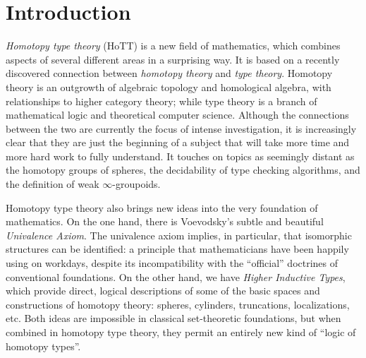 \chapter*{Introduction} \label{cha:introduction}



%
%
%
%
%
%
%
%

\emph{Homotopy type theory} (HoTT) is a new field of mathematics, which combines aspects of several different areas in a surprising way.
It is based on a recently discovered connection between \emph{homotopy theory} and \emph{type theory}.
Homotopy theory is an outgrowth of algebraic topology and homological algebra, with relationships to higher category theory; while type theory is a branch of mathematical logic and theoretical computer science.
Although the connections between the two are currently the focus of intense investigation, it is increasingly clear that they are just the beginning of a subject that will take more time and more hard work to fully understand.
It touches on topics as seemingly distant as the homotopy groups of spheres, the decidability of type checking algorithms, and the definition of weak $\infty$-groupoids.

Homotopy type theory also brings new ideas into the very foundation of mathematics.
On the one hand, there is Voevodsky's subtle and beautiful \emph{Univalence Axiom}.
The univalence axiom implies, in particular, that isomorphic structures can be identified: a principle that mathematicians have been happily using on workdays, despite its incompatibility with the ``official'' doctrines of conventional foundations.
On the other hand, we have \emph{Higher Inductive Types}, which provide direct, logical descriptions of some of the basic spaces and constructions of homotopy theory: spheres, cylinders, truncations, localizations, etc.
Both ideas are impossible in classical set-theoretic foundations, but when combined in homotopy type theory, they permit an entirely new kind of ``logic of homotopy types''.

